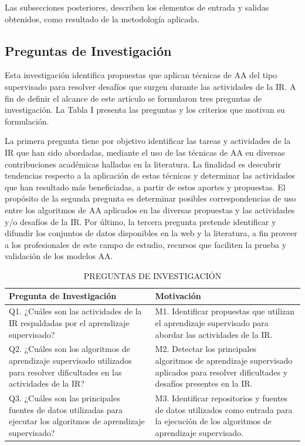 \documentclass[journal]{IEEEtran}
\begin{document}
Las subsecciones posteriores, describen los elementos de entrada y salidas obtenidos, como resultado de la metodología aplicada.

\subsection{Preguntas de Investigación}

Esta investigación identifica propuestas que aplican técnicas de AA del tipo supervisado para resolver desafíos que surgen durante las actividades de la IR. A fin de definir el alcance de este artículo se formularon tres preguntas de investigación. La Tabla I presenta las preguntas y los criterios que motivan su formulación. 

La primera pregunta tiene por objetivo identificar las tareas y  actividades de la IR que han sido abordadas, mediante el uso de las técnicas de AA  en diversas contribuciones académicas halladas en la literatura. La finalidad es descubrir tendencias respecto a la aplicación de estas técnicas  y determinar las actividades que han resultado más beneficiadas, a partir de estos aportes y propuestas. El propósito de la segunda pregunta es determinar posibles correspondencias de uso entre los algoritmos de AA aplicados en las diversas propuestas y las actividades y/o desafíos de la IR. Por último, la tercera pregunta pretende identificar y difundir los conjuntos de datos disponibles en la web y la literatura, a fin proveer a los profesionales de este campo de estudio, recursos que faciliten la prueba y validación de los modelos AA. 

\begin{table}[!t]
\renewcommand{\arraystretch}{1.3}
\caption{PREGUNTAS DE INVESTIGACIÓN}
\label{tabla1}
\centering
\begin{tabular}{p{3cm}p{4.5cm}}
\hline
\hline
Pregunta de Investigación & Motivación \\
\hline
Q1. ¿Cuáles son las actividades de la IR respaldadas por el 
aprendizaje supervisado?  & M1. Identificar propuestas que 
utilizan el aprendizaje supervisado para abordar las 
actividades de la IR.\\ \cline{1-2}
Q2. ¿Cuáles son los algoritmos de aprendizaje supervisado utilizados para resolver dificultades en las actividades de la IR? & M2. Detectar los principales algoritmos de aprendizaje supervisado aplicados para resolver dificultades y desafíos presentes en la IR. \\ \cline{1-2}
Q3. ¿Cuáles son las principales fuentes de datos utilizadas para ejecutar los algoritmos de aprendizaje supervisado? & M3. Identificar repositorios y fuentes de datos utilizados como entrada para la ejecución de los algoritmos de aprendizaje supervisado. \\
\hline \hline                                                                                                    
\end{tabular}
\end{table}
\end{document}
